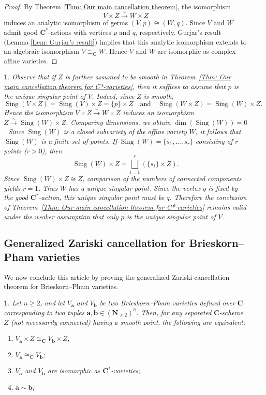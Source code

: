 \documentclass[10pt,a4paper]{amsart}
\numberwithin{equation}{section}
\numberwithin{figure}{section}
\newtheorem{thm}{\protect\theoremname}
\newtheorem{rem}{\protect\remarkname}
\providecommand{\theoremname}{Theorem}
\providecommand{\remarkname}{Remark}
\numberwithin{equation}{section}
\newcommand{\C}{\mathbf{C}}
\newcommand{\N}{\mathbf{N}}
\newcommand{\ba}{\mathbf{a}}
\newcommand{\bb}{\mathbf{b}}
\newcommand{\Sing}{\operatorname{Sing}}
\begin{document}
\begin{proof}
By Theorem \ref{Thm: Our main cancellation theorem}, the isomorphism
\[
V\times Z \xrightarrow{\sim} W\times Z
\]
induces an analytic isomorphism of germs $(V,p)\cong (W,q)$. Since $V$ and $W$ admit good $\C^*$-actions with vertices $p$ and $q$, respectively, Gurjar's result (Lemma \ref{Lem: Gurjar's result}) implies that this analytic isomorphism extends to an algebraic isomorphism $V\cong_{\C} W$. Hence $V$ and $W$ are isomorphic as complex affine varieties.
\end{proof}

\begin{rem}
Observe that if $Z$ is further assumed to be smooth in Theorem~\ref{Thm: Our main cancellation theorem for C*-varieties}, then it suffices to assume that $p$ is the unique singular point of $V$. Indeed, since $Z$ is smooth,
\[
\Sing(V\times Z)=\Sing(V)\times Z=\{p\}\times Z
\quad
\text{and}\quad 
\Sing(W\times Z)=\Sing(W)\times Z.
\]
Hence the isomorphism $V\times Z\xrightarrow{\sim} W\times Z$ induces an isomorphism $Z\xrightarrow{\sim} \Sing(W)\times Z$.
Comparing dimensions, we obtain $\dim(\Sing(W))=0$. Since $\Sing(W)$ is a closed subvariety of the affine variety $W$, it follows that $\Sing(W)$ is a finite set of points. If $\Sing(W)=\{s_1,\ldots,s_r\}$ consisting of $r$ points ($r>0$), then
\[
\Sing(W)\times Z=\bigsqcup_{i=1}^{r} \left(\{s_i\}\times Z\right).
\]
Since $\Sing(W)\times Z\cong Z$, comparison of the numbers of connected components yields $r=1$. Thus $W$ has a unique singular point. Since the vertex $q$ is fixed by the good $\C^*$-action, this unique singular point must be $q$. Therefore the conclusion of Theorem~\ref{Thm: Our main cancellation theorem for C*-varieties} remains valid under the weaker assumption that only $p$ is the unique singular point of $V$.
\end{rem}


\subsection{Generalized Zariski cancellation for Brieskorn--Pham varieties}\label{subse3.3}

We now conclude this article by proving the generalized Zariski cancellation theorem for Brieskorn--Pham varieties.


\begin{thm}\label{Thm: Our main cancellation theorem for B-P varieties}
    Let $n\geq 2$, and let $V_\ba$ and $V_\bb$ be two Brieskorn--Pham varieties defined over $\C$ corresponding to two tuples $\ba,\bb\in(\N_{\geq 2})^n$. Then, for any separated $\C$-scheme $Z$ (not necessarily connected) having a smooth point, the following are equivalent:
    \begin{enumerate}[\indent\rm(1)]
        \item $V_\ba\times Z\cong_{\C} V_\bb\times Z$;
        \item $V_\ba\cong_{\C} V_\bb$;
        \item $V_\ba$ and $V_\bb$ are isomorphic as $\C^*$-varieties;
        \item $\ba \sim \bb$;
    \end{enumerate}
\end{thm}
\end{document}

